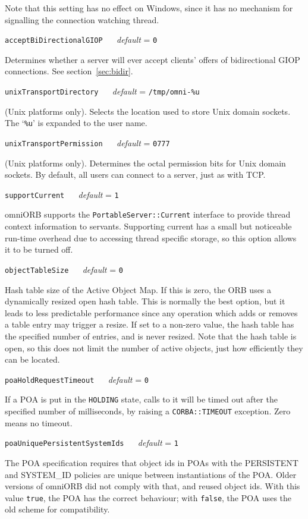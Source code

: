 \documentclass[11pt,twoside,a4paper]{book}
\makeatletter
\newcommand{\type}[1]{\texttt{#1}}
\newcommand{\code}[1]{\texttt{#1}}
\newcommand{\confopt}[2]
  {\vspace{\baselineskip}\par\noindent\code{#1} ~~ \textit{default} =
   \code{#2}}
\renewcommand{\confopt}[2]
  {\vspace{\baselineskip}\par\noindent\code{#1} ~~ \textit{default} =
   \code{#2}\\[-1ex]\@afterheading}
\makeatother
\begin{document}
Note that this setting has no effect on Windows, since it has no
mechanism for signalling the connection watching thread.


\confopt{acceptBiDirectionalGIOP}{0}

Determines whether a server will ever accept clients' offers of
bidirectional GIOP connections. See section~\ref{sec:bidir}.


\confopt{unixTransportDirectory}{/tmp/omni-\%u}

(Unix platforms only). Selects the location used to store Unix domain
sockets. The `\code{\%u}' is expanded to the user name.


\confopt{unixTransportPermission}{0777}

(Unix platforms only). Determines the octal permission bits for Unix
domain sockets. By default, all users can connect to a server, just as
with TCP.


\confopt{supportCurrent}{1}

omniORB supports the \type{PortableServer::Current} interface to
provide thread context information to servants. Supporting current has
a small but noticeable run-time overhead due to accessing thread
specific storage, so this option allows it to be turned off.


\confopt{objectTableSize}{0}

Hash table size of the Active Object Map. If this is zero, the ORB
uses a dynamically resized open hash table. This is normally the best
option, but it leads to less predictable performance since any
operation which adds or removes a table entry may trigger a resize. If
set to a non-zero value, the hash table has the specified number of
entries, and is never resized. Note that the hash table is open, so
this does not limit the number of active objects, just how efficiently
they can be located.


\confopt{poaHoldRequestTimeout}{0}

If a POA is put in the \code{HOLDING} state, calls to it will be timed
out after the specified number of milliseconds, by raising a
\code{CORBA::TIMEOUT} exception. Zero means no timeout.

\confopt{poaUniquePersistentSystemIds}{1}

The POA specification requires that object ids in POAs with the
PERSISTENT and SYSTEM\_ID policies are unique between instantiations
of the POA. Older versions of omniORB did not comply with that, and
reused object ids. With this value \code{true}, the POA has the
correct behaviour; with \code{false}, the POA uses the old scheme for
compatibility.
\end{document}

